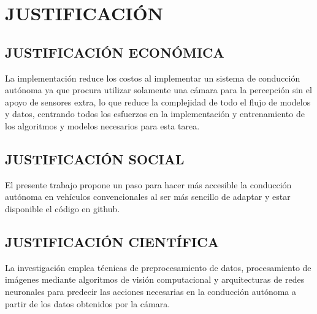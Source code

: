 \section{JUSTIFICACIÓN}
    \subsection{JUSTIFICACIÓN ECONÓMICA}
    La implementación reduce los costos al implementar un sistema de conducción autónoma ya que procura utilizar solamente una cámara para la percepción sin el apoyo de sensores extra, lo que reduce la complejidad de todo el flujo de modelos y datos, centrando todos los esfuerzos en la implementación y entrenamiento de los algoritmos y modelos necesarios para esta tarea.
    \subsection{JUSTIFICACIÓN SOCIAL}
	El presente trabajo propone un paso para hacer más accesible la conducción autónoma en vehículos convencionales al ser más sencillo de adaptar y estar disponible el código en github.
    \subsection{JUSTIFICACIÓN CIENTÍFICA}
    La investigación emplea técnicas de preprocesamiento de datos, procesamiento de imágenes mediante algoritmos de visión computacional y arquitecturas de redes neuronales para predecir las acciones necesarias en la conducción autónoma a partir de los datos obtenidos por la cámara.